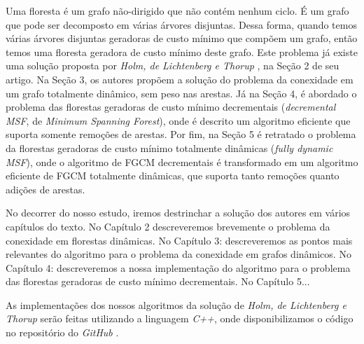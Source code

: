 Uma floresta é um grafo não-dirigido que não contém nenhum ciclo. É um grafo que pode ser decomposto em várias árvores disjuntas. Dessa forma, quando temos várias árvores disjuntas geradoras de custo mínimo que compõem um grafo, então temos uma floresta geradora de custo mínimo deste grafo. Este problema já existe uma solução proposta por \textit{Holm, de Lichtenberg e Thorup} \cite{jacob_holm}, na Seção 2 de seu artigo. Na Seção 3, os autores propõem a solução do problema da conexidade em um grafo totalmente dinâmico, sem peso nas arestas. Já na Seção 4, é abordado o problema das florestas geradoras de custo mínimo decrementais (\textit{decremental MSF}, de \textit{Minimum Spanning Forest}), onde é descrito um algoritmo eficiente que suporta somente remoções de arestas. Por fim, na Seção 5 é retratado o problema da florestas geradoras de custo mínimo totalmente dinâmicas (\textit{fully dynamic MSF}), onde o algoritmo de FGCM decrementais é transformado em um algoritmo eficiente de FGCM totalmente dinâmicas, que suporta tanto remoções quanto adições de arestas.

No decorrer do nosso estudo, iremos destrinchar a solução dos autores em vários capítulos do texto. No Capítulo 2 descreveremos brevemente o problema da conexidade em florestas dinâmicas. No Capítulo 3: descreveremos as pontos mais relevantes do algoritmo para o problema da conexidade em grafos dinâmicos. No Capítulo 4: descreveremos a nossa implementação do algoritmo para o problema das florestas geradoras de custo mínimo decrementais. No Capítulo 5...

As implementações dos nossos algoritmos da solução de \textit{Holm, de Lichtenberg e Thorup} \cite{jacob_holm} serão feitas utilizando a linguagem \textit{C++}, onde disponibilizamos o código no repositório do \textit{GitHub} \cite{chung2025}.